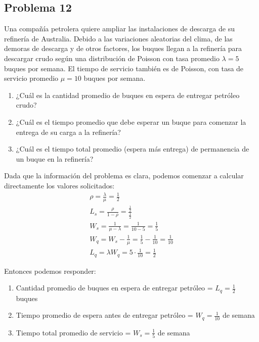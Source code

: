 \documentclass{article}
\begin{document}
        \subsection*{Problema 12}

            Una compañía petrolera quiere ampliar las instalaciones de descarga de su refinería de Australia. Debido a las variaciones aleatorias del clima, de las demoras de descarga y de otros factores, los buques llegan a la refinería para descargar crudo según una distribución de Poisson con tasa promedio $\lambda = 5$ buques por semana. El tiempo de servicio también es de Poisson, con tasa de servicio promedio $\mu = 10$ buques por semana.
            
            \begin{enumerate}
                \item ¿Cuál es la cantidad promedio de buques en espera de entregar petróleo crudo?
                \item ¿Cuál es el tiempo promedio que debe esperar un buque para comenzar la entrega de su carga a la refinería?
                \item ¿Cuál es el tiempo total promedio (espera más entrega) de permanencia de un buque en la refinería?
            \end{enumerate}

            Dada que la información del problema es clara, podemos comenzar a calcular directamente los valores solicitados:
            \begin{gather*}
                \rho = \frac{\lambda}{\mu} = \frac{1}{2} \\
                L_s = \frac{\rho}{1 - \rho} = \frac{\frac{1}{2}}{\frac{1}{2}} \\
                W_s = \frac{1}{\mu - \lambda} = \frac{1}{10 - 5} = \frac{1}{5} \\
                W_q = W_s - \frac{1}{\mu} = \frac{1}{5} - \frac{1}{10} = \frac{1}{10} \\
                L_q = \lambda W_q = 5 \cdot \frac{1}{10} = \frac{1}{2}
            \end{gather*}

            Entonces podemos responder:
            \begin{enumerate}
                \item Cantidad promedio de buques en espera de entregar petróleo = $L_q = \frac{1}{2}$ buques
                \item Tiempo promedio de espera antes de entregar petróleo = $W_q = \frac{1}{10}$ de semana
                \item Tiempo total promedio de servicio = $W_s = \frac{1}{5}$ de semana
            \end{enumerate}
\end{document}
